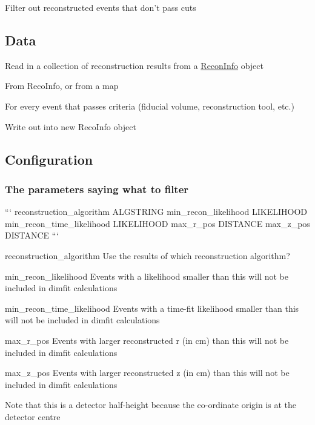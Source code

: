 Filter out reconstructed events that don't pass cuts

\subsection*{Data}


\begin{DoxyItemize}
\item Read in a collection of reconstruction results from a {\ttfamily \hyperlink{classReconInfo}{Recon\-Info}} object
\begin{DoxyItemize}
\item From {\ttfamily Reco\-Info}, or from a map
\end{DoxyItemize}
\item For every event that passes criteria (fiducial volume, reconstruction tool, etc.)
\begin{DoxyItemize}
\item Write out into new {\ttfamily Reco\-Info} object
\end{DoxyItemize}
\end{DoxyItemize}

\subsection*{Configuration}

\subsubsection*{The parameters saying what to filter}

``` reconstruction\-\_\-algorithm A\-L\-G\-S\-T\-R\-I\-N\-G min\-\_\-recon\-\_\-likelihood L\-I\-K\-E\-L\-I\-H\-O\-O\-D min\-\_\-recon\-\_\-time\-\_\-likelihood L\-I\-K\-E\-L\-I\-H\-O\-O\-D max\-\_\-r\-\_\-pos D\-I\-S\-T\-A\-N\-C\-E max\-\_\-z\-\_\-pos D\-I\-S\-T\-A\-N\-C\-E ```


\begin{DoxyItemize}
\item {\ttfamily reconstruction\-\_\-algorithm} Use the results of which reconstruction algorithm?
\item {\ttfamily min\-\_\-recon\-\_\-likelihood} Events with a likelihood smaller than this will not be included in dimfit calculations
\item {\ttfamily min\-\_\-recon\-\_\-time\-\_\-likelihood} Events with a time-\/fit likelihood smaller than this will not be included in dimfit calculations
\item {\ttfamily max\-\_\-r\-\_\-pos} Events with larger reconstructed {\ttfamily r} (in cm) than this will not be included in dimfit calculations
\item {\ttfamily max\-\_\-z\-\_\-pos} Events with larger reconstructed {\ttfamily z} (in cm) than this will not be included in dimfit calculations
\begin{DoxyItemize}
\item Note that this is a detector half-\/height because the co-\/ordinate origin is at the detector centre
\end{DoxyItemize}
\end{DoxyItemize}

